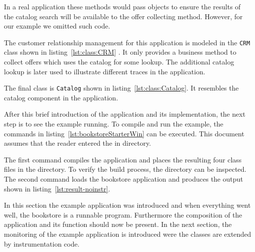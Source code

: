 In a real application these methods would pass objects to ensure the results of the catalog search will be available to the offer collecting method. However, for our example we omitted such code. 



\noindent The customer relationship management for this application is modeled in the \verb!CRM! class shown in listing~\ref{lst:class:CRM} . It only provides a business method to collect offers which uses the catalog for some lookup. The additional catalog lookup is later used to illustrate different traces in the application.



\noindent The final class is \verb!Catalog! shown in listing~\ref{lst:class:Catalog}. It resembles the catalog component in the application.



\noindent After this brief introduction of the application and its implementation, the next step is to see the example running. To compile and run the example, the commands in listing~\ref{lst:bookstoreStarterWin} can be executed. This document assumes that the reader entered the in  directory.

\setBashListing
% 
%

\noindent The first command compiles the application and places the resulting four class files in the  directory. To verify the build process, the  directory can be inspected. The second command loads the bookstore application and produces the output shown in listing~\ref{lst:result-noinstr}.



In this section the \Kieker{} example application was introduced and when everything went well, the bookstore is a runnable program. Furthermore the composition of the application and its function should now be present. In the next section, the monitoring of the example application is introduced were the classes are extended by instrumentation code.


